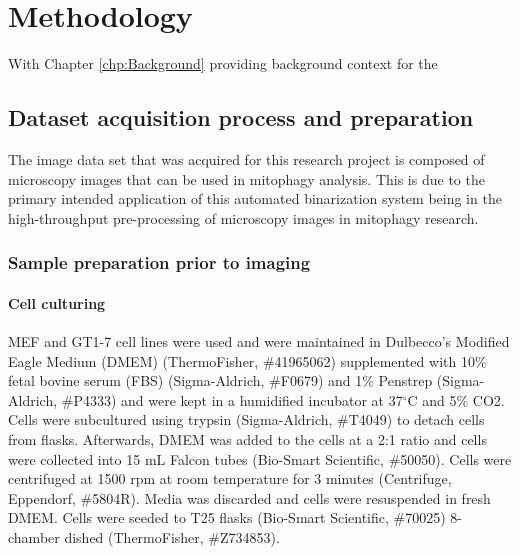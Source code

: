 \chapter{Methodology}\label{ch:methodology}

With Chapter \ref{chp:Background} providing background context for the 
\section{Dataset acquisition process and preparation}\label{sec:Dataset_making}
The image data set that was acquired for this research project is composed of microscopy images that can be used in mitophagy analysis. This is due to the primary intended application of this automated binarization system being in the high-throughput pre-processing of microscopy images in mitophagy research.
\subsection{Sample preparation prior to imaging}
\subsubsection*{Cell culturing}
MEF and GT1-7 cell lines were used and were maintained in Dulbecco's Modified Eagle Medium (DMEM) (ThermoFisher, \#41965062) supplemented with 10\% fetal bovine serum (FBS) (Sigma-Aldrich, \#F0679) and 1\% Penstrep (Sigma-Aldrich, \#P4333) and were kept in a humidified incubator at 37$^{\circ}$C and 5\% CO2. Cells were subcultured using trypsin (Sigma-Aldrich, \#T4049) to detach cells from flasks. Afterwards, DMEM was added to the cells at a 2:1 ratio and cells were collected into 15 mL Falcon tubes (Bio-Smart Scientific, \#50050). Cells were centrifuged at 1500 rpm at room temperature for 3 minutes (Centrifuge, Eppendorf, \#5804R). Media was discarded and cells were resuspended in fresh DMEM. Cells were seeded to T25 flasks (Bio-Smart Scientific, \#70025) 8-chamber dished (ThermoFisher, \#Z734853).
